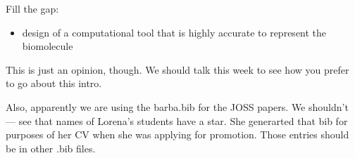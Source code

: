 {Fill the gap:
\begin{itemize}
\item design of a computational tool that is highly accurate to represent the biomolecule
\end{itemize}

This is just an opinion, though.
We should talk this week to see how you prefer to go about this intro.

Also, apparently we are using the barba.bib for the JOSS papers. We shouldn't --- see that names of Lorena's students have a star. She generarted that bib for purposes of her CV when she was applying for promotion. Those entries should be in other .bib files. 
}

